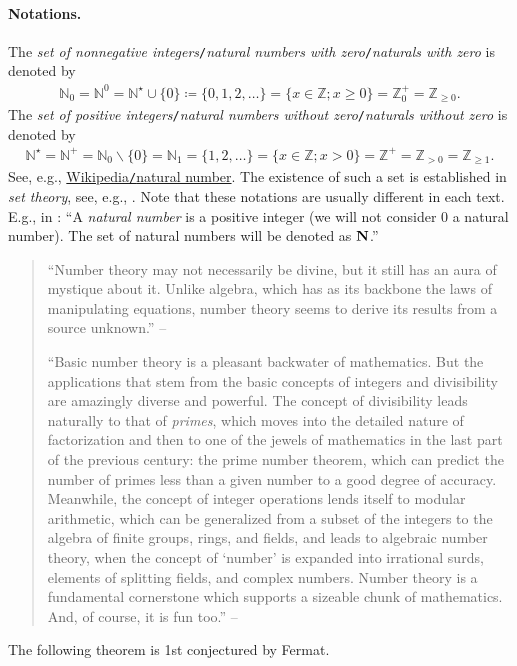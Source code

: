 \documentclass{article}
\numberwithin{equation}{section}
\begin{document}
\paragraph{Notations.} The \textit{set of nonnegative integers}\texttt{/}\textit{natural numbers with zero}\texttt{/}\textit{naturals with zero} is denoted by
\begin{align*}
	\mathbb{N}_0 = \mathbb{N}^0 = \mathbb{N}^\star\cup\{0\}\coloneqq\{0,1,2,\ldots\} = \{x\in\mathbb{Z};x\ge 0\} = \mathbb{Z}_0^+ = \mathbb{Z}_{\ge 0}.
\end{align*}
The \textit{set of positive integers}\texttt{/}\textit{natural numbers without zero}\texttt{/}\textit{naturals without zero} is denoted by
\begin{align*}
	\mathbb{N}^\star = \mathbb{N}^+ = \mathbb{N}_0\backslash\{0\} = \mathbb{N}_1 = \{1,2,\ldots\} = \{x\in\mathbb{Z};x > 0\} = \mathbb{Z}^+ = \mathbb{Z}_{> 0} = \mathbb{Z}_{\ge 1}.
\end{align*}
See, e.g., \href{https://en.wikipedia.org/wiki/Natural_number}{Wikipedia\texttt{/}natural number}. The existence of such a set is established in \textit{set theory}, see, e.g., \cite{Halmos1960, Halmos1974, Kaplansky1972, Kaplansky1977}. Note that these notations are usually different in each text. E.g., in \cite[Chap. 2, p. 10]{Tao2006}: ``A \textit{natural number} is a positive integer (we will not consider 0 a natural number). The set of natural numbers will be denoted as ${\bf N}$.''

\begin{quotation}
	``Number theory may not necessarily be divine, but it still has an aura of mystique about it. Unlike algebra, which has as its backbone the laws of manipulating equations, number theory seems to derive its results from a source unknown.'' -- \cite[Chap. 2, p. 9]{Tao2006}
	
	``Basic number theory is a pleasant backwater of mathematics. But the applications that stem from the basic concepts of integers and divisibility are amazingly diverse and powerful. The concept of divisibility leads naturally to that of \textit{primes}, which moves into the detailed nature of factorization and then to one of the jewels of mathematics in the last part of the previous century: the prime number theorem, which can predict the number of primes less than a given number to a good degree of accuracy. Meanwhile, the concept of integer operations lends itself to modular arithmetic, which can be generalized from a subset of the integers to the algebra of finite groups, rings, and fields, and leads to algebraic number theory, when the concept of `number' is expanded into irrational surds, elements of splitting 	fields, and complex numbers. Number theory is a fundamental cornerstone which supports a sizeable chunk of mathematics. And, of course, it is fun too.'' -- \cite[Chap. 2, p. 10]{Tao2006}
\end{quotation}
The following theorem is 1st conjectured by Fermat.
\end{document}
